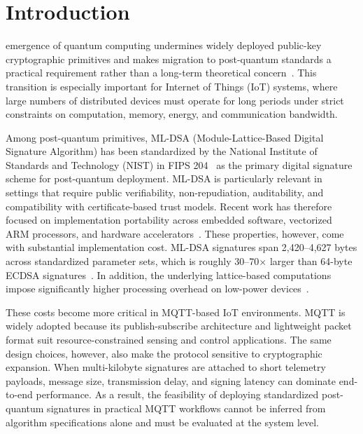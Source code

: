\documentclass[final, twoside]{IEEEtran} %
\begin{document}
\section{Introduction}

 emergence of quantum computing undermines widely deployed public-key cryptographic primitives and makes migration to post-quantum standards a practical requirement rather than a long-term theoretical concern~\cite{Khalid2019,Dinu2025,Egbuagha2025}. This transition is especially important for Internet of Things (IoT) systems, where large numbers of distributed devices must operate for long periods under strict constraints on computation, memory, energy, and communication bandwidth.

\IEEEpubidadjcol

Among post-quantum primitives, ML-DSA (Module-Lattice-Based Digital Signature Algorithm) has been standardized by the National Institute of Standards and Technology (NIST) in FIPS 204~\cite{NIST-FIPS-204} as the primary digital signature scheme for post-quantum deployment. ML-DSA is particularly relevant in settings that require public verifiability, non-repudiation, auditability, and compatibility with certificate-based trust models. Recent work has therefore focused on implementation portability across embedded software, vectorized ARM processors, and hardware accelerators~\cite{Barrett2023,Wei2025,Norga2025}. These properties, however, come with substantial implementation cost. ML-DSA signatures span 2,420--4,627 bytes across standardized parameter sets, which is roughly 30--70$\times$ larger than 64-byte ECDSA signatures~\cite{NIST-FIPS-204}. In addition, the underlying lattice-based computations impose significantly higher processing overhead on low-power devices~\cite{Ghosh2019,Benchmark2022,pqm4-benchmarks}.

These costs become more critical in MQTT-based IoT environments. MQTT is widely adopted because its publish-subscribe architecture and lightweight packet format suit resource-constrained sensing and control applications. The same design choices, however, also make the protocol sensitive to cryptographic expansion. When multi-kilobyte signatures are attached to short telemetry payloads, message size, transmission delay, and signing latency can dominate end-to-end performance. As a result, the feasibility of deploying standardized post-quantum signatures in practical MQTT workflows cannot be inferred from algorithm specifications alone and must be evaluated at the system level.
\end{document}
